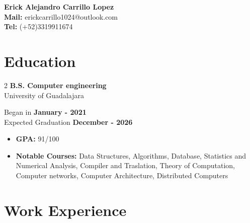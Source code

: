 \documentclass[11pt]{article}
\begin{document}
 \thispagestyle{empty}
\begin{center}
\Large{\textbf{Erick Alejandro Carrillo Lopez} \\
  \textbf{Mail:} erickcarrillo1024@outlook.com\\
  \textbf{Tel:} (+52)3319911674}
\quad\quad \href{https://github.com/alecksandr26}{\color{blue}{Github}}
\quad\quad \href{https://www.linkedin.com/in/erick-alejandro-carrillo-lopez-988112219/}{\color{blue}{Linkedin}}
\quad\quad \href{https://youtube.com/@alecksandrborovkov7602?si=v-Wa1pnCIEAbWMbH}{\color{blue}{YouTube}}
\end{center}
\vspace{-1.4cm}
\section*{Education}
\vspace{-0.4cm}
\titlerule[0.3pt]
\vspace{-0.4cm}

\begin{multicols}{2}
  \noindent
  \textbf{B.S. Computer engineering}\\
  University of Guadalajara
  
  \columnbreak
  \noindent
  Began in \textbf{January - 2021}\\
  Expected Graduation \textbf{December -  2026}
\end{multicols}
\vspace{-0.3cm}
\begin{itemize}[noitemsep, nolistsep]
\item \textbf{GPA:} 91/100
\item \textbf{Notable Courses:} Data Structures, Algorithms, Database, Statistics and Numerical Analysis,
  Compiler and Traslation, Theory of Computation, Computer networks, Computer Architecture, Distributed Computers
\end{itemize}
\vspace{-0.7cm}


\section*{Work Experience}
\vspace{-0.4cm}
\titlerule[0.3pt]
\vspace{0.1cm}
\end{document}
